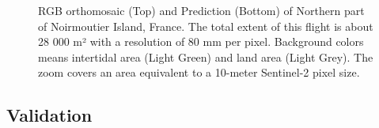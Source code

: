 \documentclass[
  number]{elsarticle}
\begin{document}
\label{cell-fig-Dike}
\begin{figure}[H]


\caption{\label{fig-Dike}RGB orthomosaic (Top) and Prediction (Bottom)
of Northern part of Noirmoutier Island, France. The total extent of this
flight is about 28 000 m² with a resolution of 80 mm per pixel.
Background colors means intertidal area (Light Green) and land area
(Light Grey). The zoom covers an area equivalent to a 10-meter
Sentinel-2 pixel size.}

\end{figure}%

\subsection{Validation}\label{validation-1}
\end{document}
